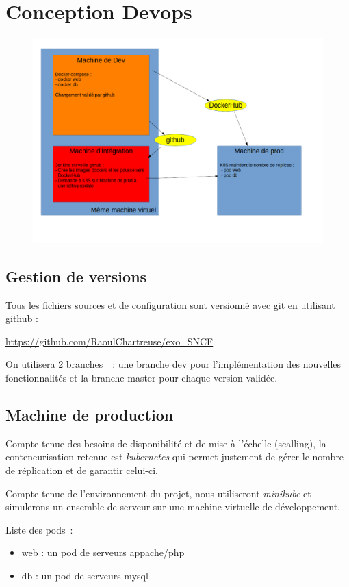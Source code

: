 ﻿\section{Conception Devops}
\begin{figure}[h]
   \includegraphics[width=1.0\textwidth]{schema.png}
\end{figure}
\subsection{Gestion de versions}
Tous les fichiers sources et de configuration sont versionné avec git en utilisant github :

\url{https://github.com/RaoulChartreuse/exo_SNCF}


On utilisera 2 branches~ : une branche dev pour l’implémentation des nouvelles fonctionnalités et la branche master pour chaque version validée.

\subsection{Machine de production}
Compte tenue des besoins de disponibilité et de mise à l’échelle (scalling), la conteneurisation retenue est \emph{kubernetes} qui permet justement de gérer le nombre de réplication et de garantir celui-ci.

Compte tenue de l’environnement du projet, nous utiliseront \emph{minikube} et simulerons un ensemble de serveur sur une machine virtuelle de développement.

Liste des pods~:
\begin{itemize}
\item web : un pod de serveurs appache/php
\item db : un pod de serveurs mysql
\end{itemize}

